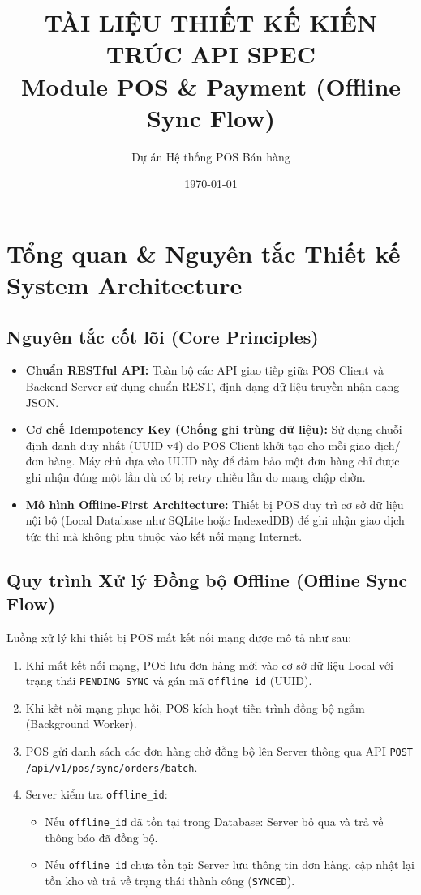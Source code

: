 \documentclass[12pt,a4paper]{article}
\title{\textbf{TÀI LIỆU THIẾT KẾ KIẾN TRÚC API SPEC}\\
	\large Module POS \& Payment (Offline Sync Flow)}
\author{Dự án Hệ thống POS Bán hàng}
\date{\today}
\begin{document}
	
	\maketitle
	
	\section{Tổng quan \& Nguyên tắc Thiết kế System Architecture}
	
	\subsection{Nguyên tắc cốt lõi (Core Principles)}
	\begin{itemize}
		\item \textbf{Chuẩn RESTful API:} Toàn bộ các API giao tiếp giữa POS Client và Backend Server sử dụng chuẩn REST, định dạng dữ liệu truyền nhận dạng JSON.
		\item \textbf{Cơ chế Idempotency Key (Chống ghi trùng dữ liệu):} Sử dụng chuỗi định danh duy nhất (UUID v4) do POS Client khởi tạo cho mỗi giao dịch/đơn hàng. Máy chủ dựa vào UUID này để đảm bảo một đơn hàng chỉ được ghi nhận đúng một lần dù có bị retry nhiều lần do mạng chập chờn.
		\item \textbf{Mô hình Offline-First Architecture:} Thiết bị POS duy trì cơ sở dữ liệu nội bộ (Local Database như SQLite hoặc IndexedDB) để ghi nhận giao dịch tức thì mà không phụ thuộc vào kết nối mạng Internet.
	\end{itemize}
	
	\subsection{Quy trình Xử lý Đồng bộ Offline (Offline Sync Flow)}
	Luồng xử lý khi thiết bị POS mất kết nối mạng được mô tả như sau:
	\begin{enumerate}
		\item Khi mất kết nối mạng, POS lưu đơn hàng mới vào cơ sở dữ liệu Local với trạng thái \texttt{PENDING\_SYNC} và gán mã \texttt{offline\_id} (UUID).
		\item Khi kết nối mạng phục hồi, POS kích hoạt tiến trình đồng bộ ngầm (Background Worker).
		\item POS gửi danh sách các đơn hàng chờ đồng bộ lên Server thông qua API \texttt{POST /api/v1/pos/sync/orders/batch}.
		\item Server kiểm tra \texttt{offline\_id}:
		\begin{itemize}
			\item Nếu \texttt{offline\_id} đã tồn tại trong Database: Server bỏ qua và trả về thông báo đã đồng bộ.
			\item Nếu \texttt{offline\_id} chưa tồn tại: Server lưu thông tin đơn hàng, cập nhật lại tồn kho và trả về trạng thái thành công (\texttt{SYNCED}).
		\end{itemize}
	\end{enumerate}
	
\end{document}
